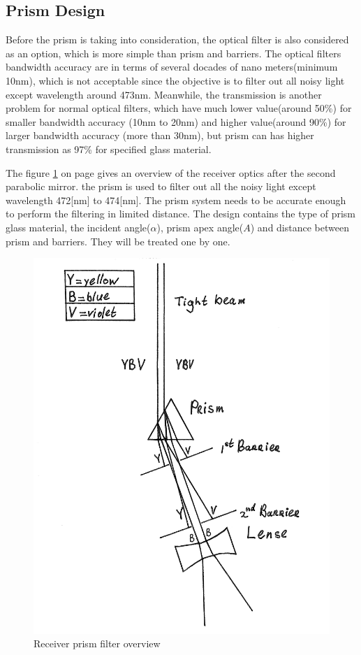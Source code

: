 \subsection{Prism Design}
\label{prism}
Before the prism is taking into consideration, the optical filter is also considered as an option, which is more simple than prism and barriers. The optical filters bandwidth accuracy are in terms of several docades of nano meters(minimum 10nm\cite{optical_filter}), which is not acceptable since the objective is to filter out all noisy light except wavelength around 473nm. Meanwhile, the transmission is another problem for normal optical filters, which have much lower value(around 50\%) for smaller bandwidth accuracy (10nm to 20nm) and higher value(around 90\%) for larger bandwidth accuracy (more than 30nm), but prism can has higher transmission as 97\% for specified glass material.

The figure \ref{fig:prism} on page \pageref{fig:prism} gives an overview of the receiver optics after the second parabolic mirror. the prism is used to filter out all the noisy light except wavelength 472[nm] to 474[nm]. The prism system needs to be accurate enough to perform the filtering in limited distance. The design contains the type of prism glass material, the incident angle($\alpha$), prism apex angle($A$) and distance between prism and barriers. They will be treated one by one.

\begin{figure}[ht!]
\centering
\includegraphics[scale = 0.6]{chapters/img/Prism.png}
\caption{Receiver prism filter overview}
\label{fig:prism}
\end{figure} 


